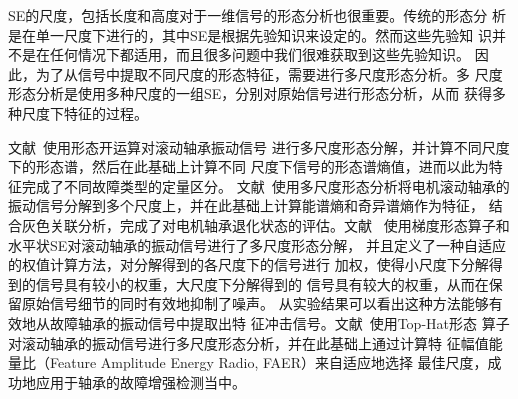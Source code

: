 SE的尺度，包括长度和高度对于一维信号的形态分析也很重要。传统的形态分
析是在单一尺度下进行的，其中SE是根据先验知识来设定的。然而这些先验知
识并不是在任何情况下都适用，而且很多问题中我们很难获取到这些先验知识。
因此，为了从信号中提取不同尺度的形态特征，需要进行多尺度形态分析。多
尺度形态分析是使用多种尺度的一组SE，分别对原始信号进行形态分析，从而
获得多种尺度下特征的过程。

文献~使用形态开运算对滚动轴承振动信号
进行多尺度形态分解，并计算不同尺度下的形态谱，然后在此基础上计算不同
尺度下信号的形态谱熵值，进而以此为特征完成了不同故障类型的定量区分。
文献~使用多尺度形态分析将电机滚动轴承的
振动信号分解到多个尺度上，并在此基础上计算能谱熵和奇异谱熵作为特征，
结合灰色关联分析，完成了对电机轴承退化状态的评估。文献~
使用梯度形态算子和水平状SE对滚动轴承的振动信号进行了多尺度形态分解，
并且定义了一种自适应的权值计算方法，对分解得到的各尺度下的信号进行
加权，使得小尺度下分解得到的信号具有较小的权重，大尺度下分解得到的
信号具有较大的权重，从而在保留原始信号细节的同时有效地抑制了噪声。
从实验结果可以看出这种方法能够有效地从故障轴承的振动信号中提取出特
征冲击信号。文献~使用Top-Hat形态
算子对滚动轴承的振动信号进行多尺度形态分析，并在此基础上通过计算特
征幅值能量比（Feature Amplitude Energy Radio, FAER）来自适应地选择
最佳尺度，成功地应用于轴承的故障增强检测当中。
